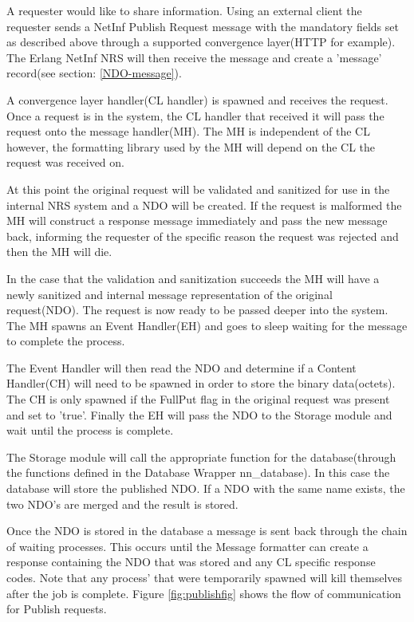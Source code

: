 A requester would like to share information. Using an external client the requester sends a NetInf Publish Request message with the mandatory fields set as described above through a supported convergence layer(HTTP for example). The Erlang NetInf NRS will then receive the message and create a 'message' record(see section: \ref{NDO-message}).

A convergence layer handler(CL handler) is spawned and receives the request.
Once a request is in the system, the CL handler that received it will pass the request onto the message handler(MH). The MH is independent of the CL however, the formatting library used by the MH will depend on the CL the request was received on.

At this point the original request will be validated and sanitized for use in the internal NRS system and a NDO will be created. If the request is malformed the MH will construct a response message immediately and pass the new message back, informing the requester of the specific reason the request was rejected and then the MH will die. 

In the case that the validation and sanitization succeeds the MH will have a newly sanitized and internal message representation of the original request(NDO). The request is now ready to be passed deeper into the system. The MH spawns an Event Handler(EH) and goes to sleep waiting for the message to complete the process. 

The Event Handler will then read the NDO and determine if a Content Handler(CH) will need to be spawned in order to store the binary data(octets). The CH is only spawned if the FullPut flag in the original request was present and set to 'true'. Finally the EH will pass the NDO to the Storage module and wait until the process is complete.

The Storage module will call the appropriate function for the database(through the functions defined in the Database Wrapper nn\_database). In this case the database will store the published NDO. If a NDO with the same name exists, the two NDO's are merged and the result is stored.

Once the NDO is stored in the database a message is sent back through the chain of waiting processes. This occurs until the Message formatter can create a response containing the NDO that was stored and any CL specific response codes. Note that any process' that were temporarily spawned will kill themselves after the job is complete. Figure \ref{fig:publishfig} shows the flow of communication for Publish requests.  


